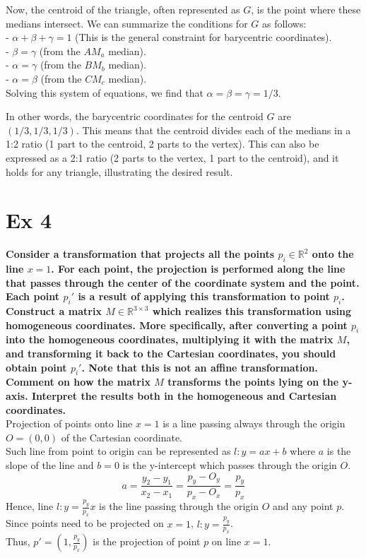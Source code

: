 \documentclass{article}
\begin{document}
Now, the centroid of the triangle, often represented as $G$, is the point where these medians intersect. We can summarize the conditions for $G$ as follows:
\\
- $\alpha + \beta + \gamma = 1$ (This is the general constraint for barycentric coordinates). \\
- $\beta = \gamma$ (from the $AM_a$ median). \\
- $\alpha = \gamma$ (from the $BM_b$ median). \\
- $\alpha = \beta$ (from the $CM_c$ median). \\

Solving this system of equations, we find that $\alpha = \beta = \gamma = 1/3$.

In other words, the barycentric coordinates for the centroid $G$ are $\left(1/3, 1/3, 1/3\right)$. This means that the centroid divides each of the medians in a 1:2 ratio (1 part to the centroid, 2 parts to the vertex). This can also be expressed as a 2:1 ratio (2 parts to the vertex, 1 part to the centroid), and it holds for any triangle, illustrating the desired result.





\cleardoublepage
\section*{Ex 4}

\textbf{Consider a transformation that projects all the points $p_i \in \mathbb{R}^2$ onto the line $x = 1$.
    For each point, the projection is performed along the line that passes
    through the center of the coordinate system and the point.
    Each point $p_i'$ is a result of applying this transformation to point $p_i$.
    Construct a matrix $M \in \mathbb{R}^{3 \times 3}$ which realizes this transformation
    using homogeneous coordinates.
    More specifically, after converting a point $p_i$ into the homogeneous coordinates,
    multiplying it with the matrix $M$, and transforming it back to the Cartesian coordinates,
    you should obtain point $p_i'$.
    Note that this is not an affine transformation.
    Comment on how the matrix $M$ transforms the points lying on the y-axis.
    Interpret the results both in the homogeneous and Cartesian coordinates.} \\\newline
Projection of points onto line $x = 1$ is a line passing always through the origin $O = (0, 0)$
of the Cartesian coordinate. \\
Such line from point to origin can be represented as $l : y = ax + b$ where $a$ is the slope of the line and
$b = 0$ is the y-intercept which passes through the origin $O$. \\
\[
    a = \frac{y_2 - y_1}{x_2 - x_1} = \frac{p_y - O_y}{p_x - O_x} = \frac{p_y}{p_x}
\]
Hence, line $l : y = \frac{p_y}{p_x} x$ is the line passing through the origin $O$ and any point $p$. \\
Since points need to be projected on $x = 1$, $l : y = \frac{p_y}{p_x}$. \\
Thus, $p' = (1, \frac{p_y}{p_x})$ is the projection of point $p$ on line $x = 1$. \\
\end{document}
